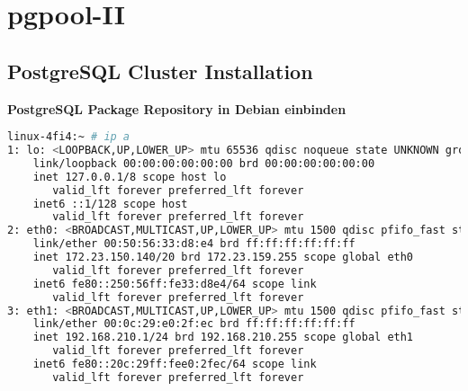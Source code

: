 
\section{pgpool-II}
\subsection{\Gls{PostgreSQL Cluster} Installation}
\textbf{\Gls{PostgreSQL} Package Repository in Debian einbinden}
\lstset{style=gra_codestyle}
\begin{lstlisting}[language=bash, caption=\gls{openSUSE} - Netzwerk Settings,captionpos=b,label={lst:opensuse-network-setting},breaklines=true]
linux-4fi4:~ # ip a
1: lo: <LOOPBACK,UP,LOWER_UP> mtu 65536 qdisc noqueue state UNKNOWN group default qlen 1
    link/loopback 00:00:00:00:00:00 brd 00:00:00:00:00:00
    inet 127.0.0.1/8 scope host lo
       valid_lft forever preferred_lft forever
    inet6 ::1/128 scope host
       valid_lft forever preferred_lft forever
2: eth0: <BROADCAST,MULTICAST,UP,LOWER_UP> mtu 1500 qdisc pfifo_fast state UP group default qlen 1000
    link/ether 00:50:56:33:d8:e4 brd ff:ff:ff:ff:ff:ff
    inet 172.23.150.140/20 brd 172.23.159.255 scope global eth0
       valid_lft forever preferred_lft forever
    inet6 fe80::250:56ff:fe33:d8e4/64 scope link
       valid_lft forever preferred_lft forever
3: eth1: <BROADCAST,MULTICAST,UP,LOWER_UP> mtu 1500 qdisc pfifo_fast state UP group default qlen 1000
    link/ether 00:0c:29:e0:2f:ec brd ff:ff:ff:ff:ff:ff
    inet 192.168.210.1/24 brd 192.168.210.255 scope global eth1
       valid_lft forever preferred_lft forever
    inet6 fe80::20c:29ff:fee0:2fec/64 scope link
       valid_lft forever preferred_lft forever
\end{lstlisting}